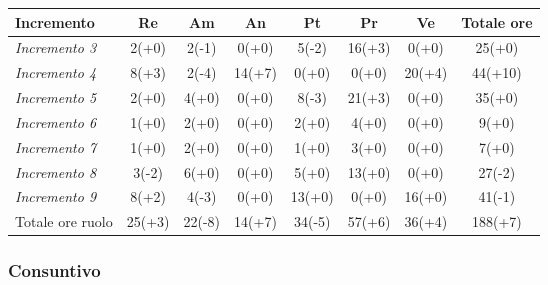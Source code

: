 {{{{{{{{{	\begin{center}
		\renewcommand{\arraystretch}{1.4}
		\begin{tabularx}{\textwidth}{|X|c|c|c|c|c|c|c|}
			\hline
			\rowcolor{airforceblue}
			\textbf{Incremento} & \textbf{Re} & \textbf{Am} & \textbf{An} & \textbf{Pt} & \textbf{Pr} & \textbf{Ve} & \textbf{Totale ore}\\
			\hline
			\textit{Incremento 3} & 2(+0) & 2(-1) & 0(+0) & 5(-2) & 16(+3) & 0(+0) & 25(+0)\\
			\hline
			\textit{Incremento 4} & 8(+3) & 2(-4) & 14(+7) & 0(+0) & 0(+0) & 20(+4) & 44(+10) \\
			\hline
			\textit{Incremento 5} & 2(+0) & 4(+0) & 0(+0) & 8(-3) & 21(+3) & 0(+0) & 35(+0)\\
			\hline
			\textit{Incremento 6} & 1(+0) & 2(+0) & 0(+0) & 2(+0) & 4(+0) & 0(+0) & 9(+0)\\
			\hline
			\textit{Incremento 7} & 1(+0) & 2(+0) & 0(+0) & 1(+0) & 3(+0) & 0(+0) & 7(+0)\\
			\hline
			\textit{Incremento 8} & 3(-2) & 6(+0) & 0(+0) & 5(+0) & 13(+0) & 0(+0) & 27(-2)\\
			\hline
			\textit{Incremento 9} & 8(+2) & 4(-3) & 0(+0) & 13(+0) & 0(+0) & 16(+0) & 41(-1)\\
			\hline
			Totale ore ruolo & 25(+3) & 22(-8) & 14(+7) & 34(-5) & 57(+6) & 36(+4) & 188(+7)\\
			\hline
		\end{tabularx}
	\end{center}

\subsubsection{Consuntivo}\label{ConsuntivoSecondoPeriodoDiProgettazioneDiDettaglioCodificaIncrementiCosto}
	
}}}}}}}}}

